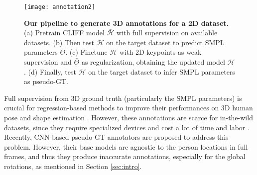 \documentclass[runningheads]{llncs}
\begin{document}
\begin{figure}[t]
	\centering
	\texttt{[image: annotation2]}
	\caption {\textbf{Our pipeline to generate 3D annotations for a 2D dataset.} (a) Pretrain CLIFF model $\bar{\mathcal{H}}$ with full supervision on available datasets. (b) Then test $\bar{\mathcal{H}}$ on the target dataset to predict SMPL parameters $\bar{\Theta}$. (c) Finetune $\bar{\mathcal{H}}$ with 2D keypoints as weak supervision and $\bar{\Theta}$ as regularization, obtaining the updated model $\mathcal{H}$. (d) Finally, test $\mathcal{H}$ on the target dataset to infer SMPL parameters as pseudo-GT.}
	\label{fig:annotation}
\end{figure}

Full supervision from 3D ground truth (particularly the SMPL parameters) is crucial for regression-based methods to improve their performances on 3D human pose and shape estimation \cite{kolotouros2019learning}. However, these annotations are scarce for in-the-wild datasets, since they require specialized devices and cost a lot of time and labor \cite{ionescu2013human3,von2018recovering}. Recently, CNN-based pseudo-GT annotators \cite{kolotouros2019learning,joo2021exemplar,moon2020neuralannot} are proposed to address this problem. However, their base models are agnostic to the person locations in full frames, and thus they produce inaccurate annotations, especially for the global rotations, as mentioned in Section \ref{sec:intro}.
\end{document}
